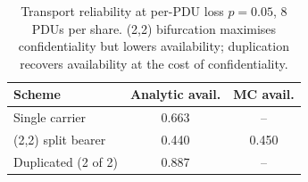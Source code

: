 \begin{table}[t]
\centering
\caption{Transport reliability at per-PDU loss $p{=}0.05$, 8 PDUs per share. (2,2) bifurcation maximises confidentiality but lowers availability; duplication recovers availability at the cost of confidentiality.}
\label{tab:reliability}
\begin{tabular}{lcc}
\toprule
Scheme & Analytic avail. & MC avail. \\
\midrule
Single carrier & 0.663 & -- \\
(2,2) split bearer & 0.440 & 0.450 \\
Duplicated (2 of 2) & 0.887 & -- \\
\bottomrule
\end{tabular}
\end{table}
